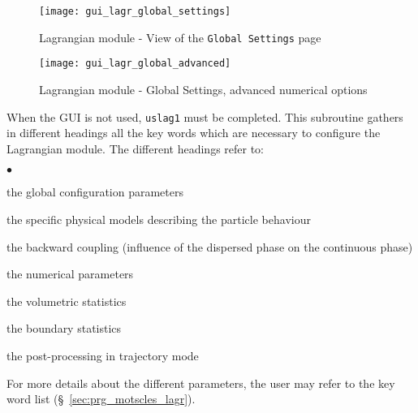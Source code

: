 {{\begin{figure}[ht]
\begin{center}
\texttt{[image: gui\_lagr\_global\_settings]}
\caption{Lagrangian module - View of the \texttt{Global Settings} page}
\label{fig:Ini-Lag1}
\end{center}
\end{figure}
%
%
 \begin{figure}[ht]
 \begin{center}
 \texttt{[image: gui\_lagr\_global\_advanced]}
 \caption{Lagrangian module - Global Settings, advanced numerical options}
 \label{fig:Ini-Lag3}
 \end{center}
 \end{figure}
%
%


\noindent
When the GUI is not used, \texttt{uslag1} must be completed. This subroutine gathers in different headings all the key words which are
necessary to configure the Lagrangian module. The different headings refer to:
\begin{list}{$\bullet$}{}
\item the global configuration parameters
\item the specific physical models describing the particle behaviour
\item the backward coupling (influence of the dispersed phase on the
      continuous phase)
\item the numerical parameters
\item the volumetric statistics
\item the boundary statistics
\item the post-processing in trajectory mode
\end{list}
%
\noindent
For more details about the different parameters, the user may refer to the
key word list (\S~\ref{sec:prg_motscles_lagr}).%




}}
